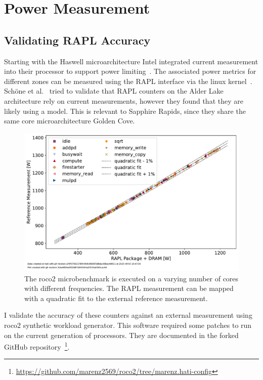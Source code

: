 \chapter{Power Measurement}

\section{Validating RAPL Accuracy}
Starting with the Haswell microarchitecture Intel integrated current measurement into their processor to support power limiting~\cite{Hackenberg_2015_Haswell}.
The associated power metrics for different zones can be measured using the RAPL interface via the linux kernel~\cite{powercap_kernel_doc}.
Schöne et al.~\cite{Schoene_2024_Alder_Lake} tried to validate that RAPL counters on the Alder Lake architecture rely on current measurements, however they found that they are likely using a model.
This is relevant to Sapphire Rapids, since they share the same core microarchitecture Golden Cove.

\begin{figure}[]
    \centering
    \includegraphics[width=0.8\columnwidth]{fig/rapl-accuracy/rapl-accuracy.pdf}
    \caption{\label{fig:validate-rapl}The roco2 microbenchmark is executed on a varying number of cores with different frequencies.
    The RAPL measurement can be mapped with a quadratic fit to the external reference measurement.}
\end{figure}

I validate the accuracy of these counters against an external measurement using roco2 synthetic workload generator.
This software required some patches to run on the current generation of processors.
They are documented in the forked GitHub repository~\footnote{\url{https://github.com/marenz2569/roco2/tree/marenz.hati-config}}.


